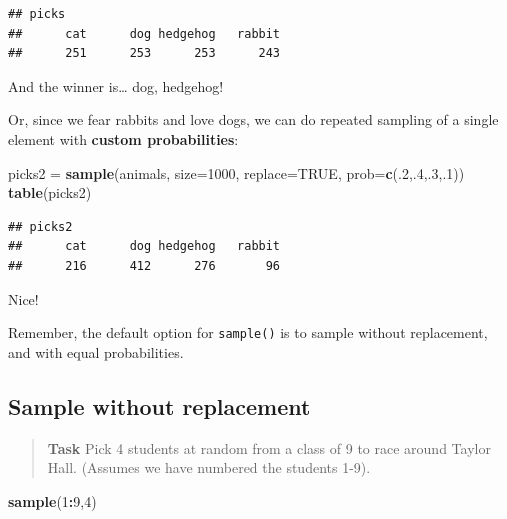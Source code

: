 \documentclass[
]{book}
\newenvironment{Shaded}{\begin{snugshade}}{\end{snugshade}}
\newcommand{\AttributeTok}[1]{\textcolor[rgb]{0.13,0.29,0.53}{#1}}
\newcommand{\ConstantTok}[1]{\textcolor[rgb]{0.56,0.35,0.01}{#1}}
\newcommand{\DecValTok}[1]{\textcolor[rgb]{0.00,0.00,0.81}{#1}}
\newcommand{\FunctionTok}[1]{\textcolor[rgb]{0.13,0.29,0.53}{\textbf{#1}}}
\newcommand{\NormalTok}[1]{#1}
\newcommand{\OtherTok}[1]{\textcolor[rgb]{0.56,0.35,0.01}{#1}}
\newcommand{\SpecialCharTok}[1]{\textcolor[rgb]{0.81,0.36,0.00}{\textbf{#1}}}
\theoremstyle{definition}
\theoremstyle{definition}
\theoremstyle{definition}
\theoremstyle{definition}
\theoremstyle{remark}
\begin{document}
\begin{verbatim}
## picks
##      cat      dog hedgehog   rabbit 
##      251      253      253      243
\end{verbatim}

And the winner is\ldots{} dog, hedgehog!

Or, since we fear rabbits and love dogs, we can do repeated sampling of a single element with \textbf{custom probabilities}:

\begin{Shaded}
\begin{Highlighting}[]
\NormalTok{picks2 }\OtherTok{=} \FunctionTok{sample}\NormalTok{(animals,}
                \AttributeTok{size=}\DecValTok{1000}\NormalTok{,}
                \AttributeTok{replace=}\ConstantTok{TRUE}\NormalTok{,}
                \AttributeTok{prob=}\FunctionTok{c}\NormalTok{(.}\DecValTok{2}\NormalTok{,.}\DecValTok{4}\NormalTok{,.}\DecValTok{3}\NormalTok{,.}\DecValTok{1}\NormalTok{))}
\FunctionTok{table}\NormalTok{(picks2)}
\end{Highlighting}
\end{Shaded}

\begin{verbatim}
## picks2
##      cat      dog hedgehog   rabbit 
##      216      412      276       96
\end{verbatim}

Nice!

Remember, the default option for \texttt{sample()} is to sample without replacement, and with equal probabilities.

\subsection*{Sample without replacement}\label{sample-without-replacement}

\begin{quote}
\textbf{Task}
Pick 4 students at random from a class of 9 to race around Taylor Hall. (Assumes we have numbered the students 1-9).
\end{quote}

\begin{Shaded}
\begin{Highlighting}[]
\FunctionTok{sample}\NormalTok{(}\DecValTok{1}\SpecialCharTok{:}\DecValTok{9}\NormalTok{,}\DecValTok{4}\NormalTok{)}
\end{Highlighting}
\end{Shaded}
\end{document}
